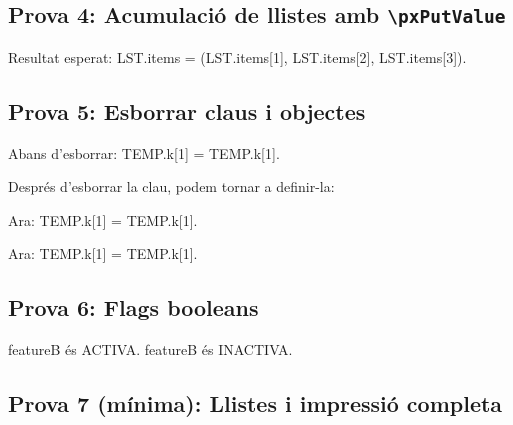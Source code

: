 \documentclass[fake,cover-config=offset,default]{P3CTeX}
\begin{document}
	\bigskip

	\subsection{Prova 4: Acumulació de llistes amb \texttt{\textbackslash pxPutValue}}



	Resultat esperat: LST.items = (\pxGET LST.items[1], \pxGET LST.items[2], \pxGET LST.items[3]).

	\bigskip
	\subsection{Prova 5: Esborrar claus i objectes}


	Abans d'esborrar: TEMP.k[1] = \pxGET TEMP.k[1].


	Després d'esborrar la clau, podem tornar a definir-la:


	Ara: TEMP.k[1] = \pxGET TEMP.k[1].


	Ara: TEMP.k[1] = \pxGET TEMP.k[1].
	\bigskip

	\subsection{Prova 6: Flags booleans}




	\par

	{featureB és ACTIVA.}
	{featureB és INACTIVA.}

	\bigskip

	\subsection{Prova 7 (mínima): Llistes i impressió completa}
\end{document}
